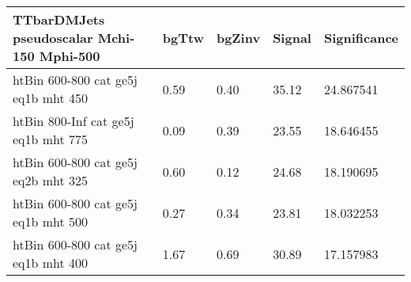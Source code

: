  \begin{tabular}{|l|l|l|l|l|}
  \small
   \label{mostSensitiveBins_TTbarDMJets_pseudoscalar_Mchi-150_Mphi-500_25ns}
	\textbf{TTbarDMJets pseudoscalar Mchi-150 Mphi-500}	 & 	bgTtw	 & 	bgZinv	 & 	Signal &	 Significance \\ 
	\hline
	htBin 600-800 cat ge5j eq1b mht 450 & 	0.59	 & 	0.40	 & 	35.12 	&24.867541 \\ 
	htBin 800-Inf cat ge5j eq1b mht 775 & 	0.09	 & 	0.39	 & 	23.55 	&18.646455 \\ 
	htBin 600-800 cat ge5j eq2b mht 325 & 	0.60	 & 	0.12	 & 	24.68 	&18.190695 \\ 
	htBin 600-800 cat ge5j eq1b mht 500 & 	0.27	 & 	0.34	 & 	23.81 	&18.032253 \\ 
	htBin 600-800 cat ge5j eq1b mht 400 & 	1.67	 & 	0.69	 & 	30.89 	&17.157983 \\ 
\end{tabular}
